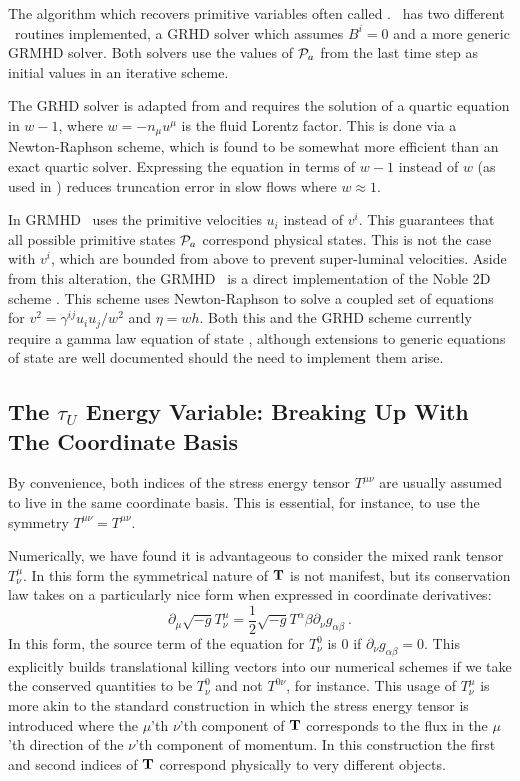 The algorithm which recovers primitive variables often called \ctop.  \grdisco\ has two different \ctop\ routines implemented, a GRHD solver which assumes $B^i=0$ and a more generic GRMHD solver.  Both solvers use the values of $\mathcal{P}_a$ from the last time step as initial values in an iterative scheme.  

The GRHD solver is adapted from \citet{Duez05} and requires the solution of a quartic equation in $w-1$, where $w = -n_\mu u^\mu$ is the fluid Lorentz factor.  This is done via a Newton-Raphson scheme, which is found to be somewhat more efficient than an exact quartic solver.  Expressing the equation in terms of $w-1$ instead of $w$ (as used in \citet{Duez05}) reduces truncation error in slow flows where $w \approx 1$.

In GRMHD \grdisco\ uses the primitive velocities $u_i$ instead of $v^i$.  This guarantees that all possible primitive states $\mathcal{P}_a$ correspond physical states.  This is not the case with $v^i$, which are bounded from above to prevent super-luminal velocities.  Aside from this alteration, the GRMHD \ctop\  is a direct implementation of the Noble 2D scheme \citep{Noble06}.  This scheme uses Newton-Raphson to solve a coupled set of equations for $v^2 = \gamma^{ij}u_i u_j / w^2$ and $\eta = w h$.  Both this and the GRHD scheme currently require a gamma law equation of state , although extensions to generic equations of state are well documented should the need to implement them arise.

\subsection{The $\tau_U$ Energy Variable: Breaking Up With The Coordinate Basis}

By convenience, both indices of the stress energy tensor $T^{\mu\nu}$ are usually assumed to live in the same coordinate basis.  This is essential, for instance, to use the symmetry $T^{\mu\nu} = T^{\mu\nu}$.

Numerically, we have found it is advantageous to consider the mixed rank tensor $T^\mu_\nu$.  In this form the symmetrical nature of ${\bf T}$ is not manifest, but its conservation law takes on a particularly nice form when expressed in coordinate derivatives:
\begin{equation}
	\partial_\mu \sqrt{-g} T^\mu_\nu = \frac{1}{2}\sqrt{-g}T^{\alpha}{\beta}\partial_\nu g_{\alpha \beta}\ .
\end{equation}
In this form, the source term of the equation for $T^0_\nu$ is 0 if $\partial_\nu g_{\alpha \beta} = 0$.  This explicitly builds translational killing vectors into our numerical schemes if we take the conserved quantities to be $T^0_\nu$ and not $T^{0\nu}$, for instance.  This usage of $T^\mu_\nu$ is more akin to the standard construction in which the stress energy tensor is introduced where the $\mu$'th $\nu$'th component of ${\bf T}$ corresponds to the flux in the $\mu$'th direction of the $\nu$'th component of momentum.  In this construction the first and second indices of ${\bf T}$ correspond physically to very different objects.

